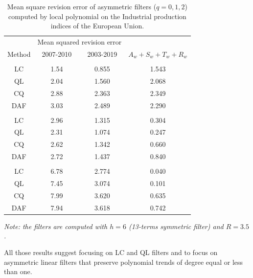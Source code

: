 \documentclass[
  12pt,
  ,
  a4paper]{article}
\newcommand\1{\mathds{1}}
\begin{document}
\begin{table}[!htb]
\caption{\label{tab:mseIPI}Mean square revision error of asymmetric filters ($q=0,1,2$) computed by local polynomial on the Industrial production indices of the European Union.}
\centering
\begin{tabular}[t]{cccc}
\toprule
\multicolumn{1}{c}{ } & \multicolumn{2}{c}{Mean squared revision error} & \multicolumn{1}{c}{ } \\
\cmidrule(l{3pt}r{3pt}){2-3}
Method & 2007-2010 & 2003-2019 & $A_w+S_w+T_w+R_w$\\
\midrule
\addlinespace[0.3em]
\multicolumn{4}{l}{$q=0$}\\
\hspace{1em}LC & 1.54 & 0.855 & 1.543\\
\hspace{1em}QL & 2.04 & 1.560 & 2.068\\
\hspace{1em}CQ & 2.88 & 2.363 & 2.349\\
\hspace{1em}DAF & 3.03 & 2.489 & 2.290\\
\addlinespace[0.3em]
\multicolumn{4}{l}{$q=1$}\\
\hspace{1em}LC & 2.96 & 1.315 & 0.304\\
\hspace{1em}QL & 2.31 & 1.074 & 0.247\\
\hspace{1em}CQ & 2.62 & 1.342 & 0.660\\
\hspace{1em}DAF & 2.72 & 1.437 & 0.840\\
\addlinespace[0.3em]
\multicolumn{4}{l}{$q=2$}\\
\hspace{1em}LC & 6.78 & 2.774 & 0.040\\
\hspace{1em}QL & 7.45 & 3.074 & 0.101\\
\hspace{1em}CQ & 7.99 & 3.620 & 0.635\\
\hspace{1em}DAF & 7.94 & 3.618 & 0.742\\
\bottomrule
\end{tabular}

\emph{Note: the filters are computed with $h=6$ (13-terms symmetric filter) and $R=3.5$.}
\end{table}

\faArrowCircleRight{} All those results suggest focusing on LC and QL filters and to focus on asymmetric linear filters that preserve polynomial trends of degree equal or less than one.
\end{document}
